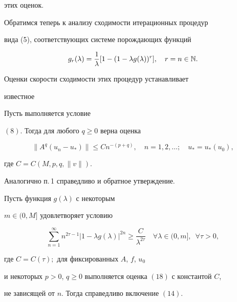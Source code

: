 этих оценок. 


 


Обратимся теперь к анализу сходимости итерационных процедур 


вида (5), соответствующих системе порождающих функций 


\begin{equation} 


g_r(\lambda)=\frac{1}{\lambda}[1-(1-\lambda g(\lambda))^r], 


\quad r=n\in\Bbb N. 


\end{equation} 


Оценки скорости сходимости этих процедур устанавливает


известное 


 


\begin{prop} 


Пусть выполняется условие 


$(8)$. Тогда для любого $q\ge0$ верна оценка 


\begin{equation} 


\|A^q(u_n-u_*)\|\le C n^{-(p+q)},\quad 


n=1,2,\dotsc;\quad u_*=u_*(u_0), 


\end{equation} 


где $C=C(M,p,q,\|v\|)$. 


\end{prop} 


 


Аналогично п.\,1 справедливо и обратное утверждение. 


 


\begin{thm} 


Пусть функция $g(\lambda)$ с некоторым 


$m\in(0,M]$ удовлетворяет условию 


\begin{equation} 


\sum^\infty_{n=1}n^{2\tau-1} 


|1-\lambda g(\lambda)|^{2n}\ge 


\frac{C}{\lambda^{2\tau}}\quad \forall\lambda\in(0,m], 


\ \;\forall\tau>0, 


\end{equation} 


где $C=C(\tau);$ для фиксированных $A$, $f$, $u_0$ 


и некоторых $p>0$, $q\ge0$ выполняется оценка $(18)$ с константой $C$, 


не зависящей от $n$. Тогда справедливо включение $(14)$. 


\end{thm} 


